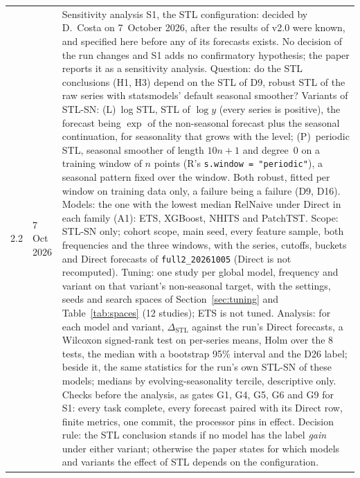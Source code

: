 \documentclass[11pt,a4paper]{article}
\newcommand{\code}[1]{\texttt{#1}}
\newcommand{\dstl}{\Delta_{\mathrm{STL}}}
\begin{document}
\begin{longtable}{@{}p{1.3cm} p{1.9cm} p{11.8cm}@{}}
2.2 & 7 Oct 2026 & Sensitivity analysis S1, the STL configuration: decided by D.\ Costa on 7~October 2026, after the results of v2.0 were known, and specified here before any of its forecasts exists. No decision of the run changes and S1 adds no confirmatory hypothesis; the paper reports it as a sensitivity analysis. Question: do the STL conclusions (H1, H3) depend on the STL of D9, robust STL of the raw series with statsmodels' default seasonal smoother? Variants of STL-SN: (L)~log STL, STL of $\log y$ (every series is positive), the forecast being $\exp$ of the non-seasonal forecast plus the seasonal continuation, for seasonality that grows with the level; (P)~periodic STL, seasonal smoother of length $10n+1$ and degree~0 on a training window of $n$ points (R's \code{s.window = "periodic"}), a seasonal pattern fixed over the window. Both robust, fitted per window on training data only, a failure being a failure (D9, D16). Models: the one with the lowest median RelNaive under Direct in each family (A1): ETS, XGBoost, NHITS and PatchTST. Scope: STL-SN only; cohort scope, main seed, every feature sample, both frequencies and the three windows, with the series, cutoffs, buckets and Direct forecasts of \mbox{\code{full2_20261005}} (Direct is not recomputed). Tuning: one study per global model, frequency and variant on that variant's non-seasonal target, with the settings, seeds and search spaces of Section~\ref{sec:tuning} and Table~\ref{tab:spaces} (12 studies); ETS is not tuned. Analysis: for each model and variant, $\dstl$ against the run's Direct forecasts, a Wilcoxon signed-rank test on per-series means, Holm over the 8 tests, the median with a bootstrap 95\% interval and the D26 label; beside it, the same statistics for the run's own STL-SN of these models; medians by evolving-seasonality tercile, descriptive only. Checks before the analysis, as gates G1, G4, G5, G6 and G9 for S1: every task complete, every forecast paired with its Direct row, finite metrics, one commit, the processor pins in effect. Decision rule: the STL conclusion stands if no model has the label \emph{gain} under either variant; otherwise the paper states for which models and variants the effect of STL depends on the configuration. \\

\end{longtable}
\end{document}
